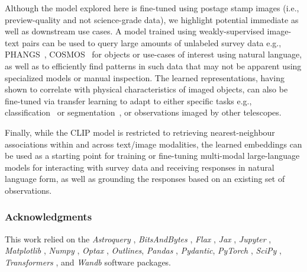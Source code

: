 \documentclass{article} %
\newcommand{\package}[1]{\textsl{#1}\xspace}
\begin{document}
   Although the model explored here is fine-tuned using postage stamp images (i.e., preview-quality and not science-grade data), we highlight potential immediate as well as downstream use cases.
   A model trained using weakly-supervised image-text pairs can be used to query large amounts of unlabeled survey data e.g., PHANGS~\citep{lee2022phangs}, COSMOS~\citep{scoville2007cosmic} for objects or use-cases of interest using natural language, as well as to efficiently find patterns in such data that may not be apparent using specialized models or manual inspection.
   The learned representations, having shown to correlate with physical characteristics of imaged objects, can also be fine-tuned via transfer learning to adapt to either specific tasks e.g., classification~\citep{wei2020deep} or segmentation~\citep{hausen2020morpheus}, or observations imaged by other telescopes.
   
   Finally, while the CLIP model is restricted to retrieving nearest-neighbour associations within and across text/image modalities, the learned embeddings can be used as a starting point for training or fine-tuning multi-modal large-language models for interacting with survey data and receiving responses in natural language form, as well as grounding the responses based on an existing set of observations.
   


\subsubsection*{Acknowledgments}

This work relied on the \package{Astroquery} \citep{2019AJ....157...98G}, \package{BitsAndBytes} \citep{dettmers2022llmint8}, \package{Flax} \citep{flax2020github}, \package{Jax} \citep{jax2018github}, \package{Jupyter} \citep{Kluyver2016jupyter}, \package{Matplotlib} \citep{Hunter:2007}, \package{Numpy} \citep{harris2020array}, \package{Optax} \citep{deepmind2020jax}, \package{Outlines}, \package{Pandas} \citep{2020SciPy-NMeth}, \package{Pydantic}, \package{PyTorch} \citep{paszke2019pytorch}, \package{SciPy} \citep{2020SciPy-NMeth}, \package{Transformers} \citep{wolf2019huggingface}, and \package{Wandb} \citep{wandb} software packages.
\end{document}
